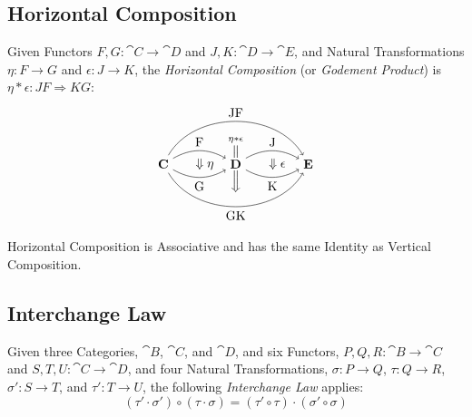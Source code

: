 \subsection{Horizontal Composition}\label{sec:horizontal_composition}

Given Functors $F,G : \cat{C} \rightarrow \cat{D}$ and $J,K : \cat{D}
\rightarrow \cat{E}$, and Natural Transformations $\eta : F
\rightarrow G$ and $\epsilon : J \rightarrow K$, the \emph{Horizontal
  Composition} (or \emph{Godement Product}) is $\eta * \epsilon : JF
\Rightarrow KG$:
\[
  \begin{tikzpicture}
    \node (U) at (0,0) {$\stackrel{\eta*\epsilon}
      {\stackrel{\Big\|}{\Big\Downarrow}}$};
    \node [fill,color=white,scale=1.5] (W) at (0,0) {};
    \node (C) at (-2,0) {$\cat{C}$};
    \node (D) at (0,0) {$\cat{D}$};
    \node (E) at (2,0) {$\cat{E}$};
    \node (S) at (-1,0) {$\;\;\;\Downarrow\eta$};
    \node (T) at (1,0) {$\;\;\;\Downarrow\epsilon$};
    \draw[->,bend left] (C) to node [above] {F} (D);
    \draw[->,bend right] (C) to node [below] {G} (D);
    \draw[->,bend left] (D) to node [above] {J} (E);
    \draw[->,bend right] (D) to node [below] {K} (E);
    \draw[->,bend left=60] (C) to node [above] {JF} (E);
    \draw[->,bend right=60] (C) to node [below] {GK} (E);
  \end{tikzpicture}
\]

Horizontal Composition is Associative and has the same Identity as
Vertical Composition.



\subsection{Interchange Law}\label{sec:interchange_law}

Given three Categories, $\cat{B}$, $\cat{C}$, and $\cat{D}$,
and six Functors, $P,Q,R : \cat{B} \rightarrow \cat{C}$ and
$S,T,U : \cat{C} \rightarrow \cat{D}$, and four Natural
Transformations, $\sigma : P \rightarrow Q$, $\tau : Q \rightarrow R$,
$\sigma' : S \rightarrow T$, and $\tau' : T \rightarrow U$, the
following \emph{Interchange Law} applies:
\[
  (\tau' \cdot \sigma') \circ (\tau \cdot \sigma) =
  (\tau' \circ \tau) \cdot (\sigma' \circ \sigma)
\]



